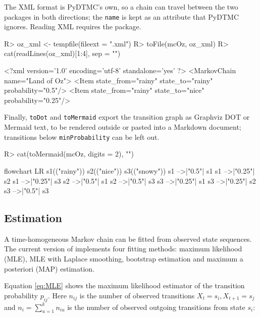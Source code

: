 \documentclass[
  nojss]{jss}
\begin{document}
The XML format is PyDTMC's own, so a chain can travel between the two
packages in both directions; the \texttt{name} is kept as an attribute that
PyDTMC ignores. Reading XML requires the  package.

\begin{CodeChunk}
\begin{CodeInput}
R> oz_xml <- tempfile(fileext = ".xml")
R> toFile(mcOz, oz_xml)
R> cat(readLines(oz_xml)[1:4], sep = "\n")
\end{CodeInput}
\begin{CodeOutput}
<?xml version='1.0' encoding='utf-8' standalone='yes' ?>
<MarkovChain name="Land of Oz">
    <Item state_from="rainy" state_to="rainy" probability="0.5"/>
    <Item state_from="rainy" state_to="nice" probability="0.25"/>
\end{CodeOutput}
\end{CodeChunk}

Finally, \texttt{toDot} and \texttt{toMermaid} export the transition graph as Graphviz
DOT or Mermaid text, to be rendered outside  or pasted into a
Markdown document; transitions below \texttt{minProbability} can be left out.

\begin{CodeChunk}
\begin{CodeInput}
R> cat(toMermaid(mcOz, digits = 2), "\n")
\end{CodeInput}
\begin{CodeOutput}
flowchart LR
  s1(("rainy"))
  s2(("nice"))
  s3(("snowy"))
  s1 -->|"0.5"| s1
  s1 -->|"0.25"| s2
  s1 -->|"0.25"| s3
  s2 -->|"0.5"| s1
  s2 -->|"0.5"| s3
  s3 -->|"0.25"| s1
  s3 -->|"0.25"| s2
  s3 -->|"0.5"| s3 
\end{CodeOutput}
\end{CodeChunk}

\subsection{Estimation}\label{estimation}

A time-homogeneous Markov chain can be fitted from observed state sequences. The current version of  implements four fitting methods: maximum likelihood (MLE), MLE with Laplace smoothing, bootstrap estimation and maximum a posteriori (MAP) estimation.

Equation \ref{eq:MLE} shows the maximum likelihood estimator of the transition probability \(p_{ij}\). Here \(n_{ij}\) is the number of observed transitions \(X_t=s_i, X_{t+1}=s_j\) and \(n_i = \sum_{u=1}^k n_{iu}\) is the number of observed outgoing transitions from state \(s_i\):
\end{document}
